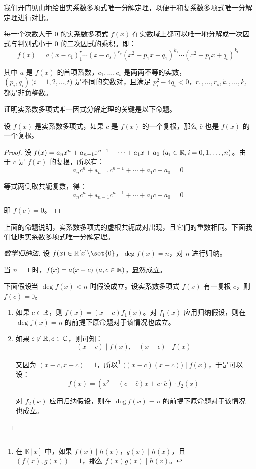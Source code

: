 我们开门见山地给出实系数多项式唯一分解定理，以便于和复系数多项式唯一分解定理进行对比。

\begin{theorem}[实系数多项式唯一分解定理]
	每一个次数大于 $0$ 的实系数多项式 $f(x)$ 在实数域上都可以唯一地分解成一次因式与判别式小于 $0$ 的二次因式的乘积。即：
	$$
	f(x) = a (x - c_1)^r_1 \cdots (x - c_s)^{r_s} (x^2 + p_1 x + q_1)^{k_1} \cdots (x^2 + p_t x + q_t)^{k_t}
	$$

	其中 $a$ 是 $f(x)$ 的首项系数，$c_1, \ldots, c_s$ 是两两不等的实数，$(p_i, q_i) \pod{i = 1, 2, \ldots, t}$ 是不同的实数对，且满足 $p_i^2 - 4 q_i < 0$，$r_1, \ldots, r_s, k_1, \ldots, k_t$ 都是非负整数。
\end{theorem}

证明实系数多项式唯一因式分解定理的关键是以下命题。

\begin{proposition}
	设 $f(x)$ 是实系数多项式，如果 $c$ 是 $f(x)$ 的一个复根，那么 $\overline c$ 也是 $f(x)$ 的一个复根。
\end{proposition}

\begin{proof}
	设 $f(x) = a_n x^n + a_{n - 1} x^{n - 1} + \cdots + a_1 x + a_0 \pod{a_i \in \mathbb R, i = 0, 1, \ldots, n}$。由于 $c$ 是 $f(x)$ 的复根，所以有：
	$$
	a_n c^n + a_{n - 1} c^{n - 1} + \cdots + a_1 c + a_0 = 0
	$$

	等式两侧取共轭复数，得：
	$$
	a_n \overline c^n + a_{n - 1} \overline c^{n - 1} + \cdots + a_1 \overline c + a_0 = 0
	$$

	即 $f(\overline c) = 0$。
\end{proof}

上面的命题说明，实系数多项式的虚根共轭成对出现，且它们的重数相同。下面我们证明实系数多项式唯一分解定理。

\begin{proof}[数学归纳法]
	设 $f(x) \in \R[x] \backslash \set{0}$，$\deg f(x) = n$，对 $n$ 进行归纳。

	当 $n = 1$ 时，$f(x) = a(x - c) \pod{a, c \in \mathbb R}$，显然成立。

	下面假设当 $\deg f(x) < n$ 时假设成立。设实系数多项式 $f(x)$ 有一复根 $c$，则 $f(c) = 0$。
	\begin{enumerate}
		\item 如果 $c \in \mathbb R$，则 $f(x) = (x - c) f_1(x)$。对 $f_1(x)$ 应用归纳假设，则在 $\deg f(x) = n$ 的前提下原命题对于该情况也成立。

		\item 如果 $c \not \in \mathbb R, c \in \mathbb C$，则可知：
		$$
		(x - c) \mid f(x), \quad (x - \overline c) \mid f(x)
		$$

		又因为 $(x - c, x - \overline c) = 1$，所以\footnote{在 $\mathbb K[x]$ 中，如果 $f(x) \mid h(x)$，$g(x) \mid h(x)$，且 $(f(x), g(x)) = 1$，那么 $f(x) g(x) \mid h(x)$。} $\bigl( (x - c) (x - \overline c) \bigr) \mid f(x)$，于是可以设：
		$$
		f(x) = (x^2 - (c + \overline c) x + c \cdot \overline c) \cdot f_2(x)
		$$

		对 $f_2(x)$ 应用归纳假设，则在 $\deg f(x) = n$ 的前提下原命题对于该情况也成立。
	\end{enumerate}
\end{proof}

